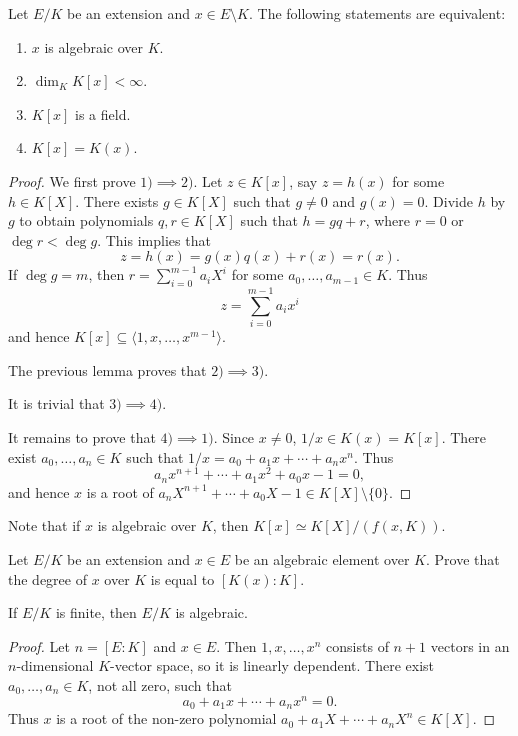 \begin{theorem}
\label{thm:simple extesnions}
	Let $E/K$ be an extension and $x\in E\setminus K$.
	The following statements are equivalent:
	\begin{enumerate}
		\item $x$ is algebraic over $K$.
		\item $\dim_KK[x]<\infty$.
		\item $K[x]$ is a field.
		\item $K[x]=K(x)$. 
	\end{enumerate}
\end{theorem}

\begin{proof}
	We first prove $1)\implies 2)$. Let $z\in K[x]$, say $z=h(x)$ for some $h\in K[X]$. There exists
	$g\in K[X]$ such that $g\ne 0$ and $g(x)=0$. Divide $h$ by $g$ to obtain 
	polynomials $q,r\in K[X]$ such that $h=gq+r$, where $r=0$ or $\deg r<\deg g$. This implies that
	\[
		z=h(x)=g(x)q(x)+r(x)=r(x).
	\]
	If $\deg g=m$, then $r=\sum_{i=0}^{m-1}a_iX^i$ for some $a_0,\dots,a_{m-1}\in K$. Thus
	\[
 z=\sum_{i=0}^{m-1}a_ix^i 
 \]
 and hence $K[x]\subseteq\langle 1,x,\dots,x^{m-1}\rangle$. 

	The previous lemma proves that $2)\implies 3)$. 

	It is trivial that $3)\implies 4)$. 

	It remains to prove that $4)\implies 1)$. 
	Since $x\ne 0$, $1/x\in K(x)=K[x]$. There exist $a_0,\dots,a_n\in K$ such that
	$1/x=a_0+a_1x+\cdots+a_nx^n$. Thus
	\[
		a_nx^{n+1}+\cdots+a_1x^2+a_0x-1=0, 
	\]
	and hence $x$ is a root of $a_nX^{n+1}+\cdots+a_0X-1\in K[X]\setminus\{0\}$. 
\end{proof}

Note that if $x$ is algebraic over $K$, then
$K[x]\simeq K[X]/(f(x,K))$. 

\begin{exercise}
\label{xca:degree_of_x}
    Let $E/K$ be an extension and $x\in E$ be an algebraic element over $K$.
    Prove that the degree of $x$ over $K$ is equal to $[K(x):K]$. 
\end{exercise}

\begin{corollary}
\label{cor:finite=>algebraic}
	If $E/K$ is finite, then $E/K$ is algebraic. 
\end{corollary}

\begin{proof}
	Let $n=[E:K]$ and $x\in E$. Then $1,x,\dots,x^n$ consists of $n+1$ vectors in an $n$-dimensional $K$-vector space, so it is linearly dependent. 
	There exist $a_0,\dots,a_n\in K$, not all zero, such that
	\[
        a_0+a_1x+\cdots+a_nx^n=0.
        \]
        Thus $x$ is a root of the non-zero
	polynomial $a_0+a_1X+\cdots+a_nX^n\in K[X]$. 
\end{proof}

